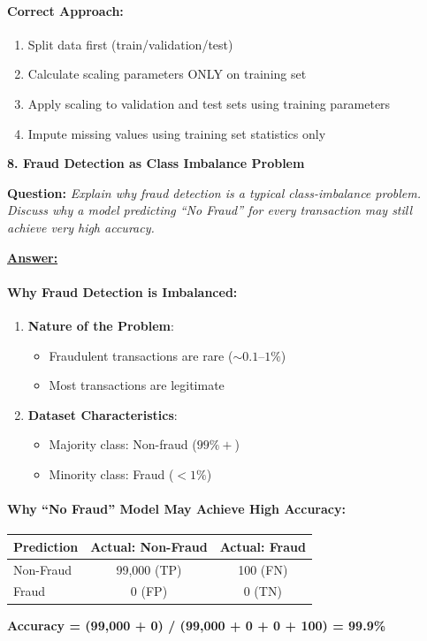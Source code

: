 \documentclass[11pt,a4paper]{article}
\newcommand{\questiontitle}[2]{%
    \vspace{0.4cm}%
    \noindent\textbf{\large\color{headerblue}#1. #2}\par\vspace{0.15cm}%
}
\newcommand{\qprompt}[1]{%
    \noindent\textbf{Question:} \textit{#1}\par\vspace{0.2cm}%
}
\newcommand{\answer}{\noindent\textbf{\underline{Answer:}}\par\vspace{0.15cm}}
\begin{document}
\paragraph{Correct Approach:}
\begin{enumerate}
    \item Split data first (train/validation/test)
    \item Calculate scaling parameters ONLY on training set
    \item Apply scaling to validation and test sets using training parameters
    \item Impute missing values using training set statistics only
\end{enumerate}

\vspace{0.35cm}

\questiontitle{8}{Fraud Detection as Class Imbalance Problem}
\qprompt{Explain why fraud detection is a typical class-imbalance problem. Discuss why a model predicting ``No Fraud'' for every transaction may still achieve very high accuracy.}
\answer
\paragraph{Why Fraud Detection is Imbalanced:}
\begin{enumerate}
    \item \textbf{Nature of the Problem}:
    \begin{itemize}
        \item Fraudulent transactions are rare ($\sim 0.1\text{--}1\%$)
        \item Most transactions are legitimate
    \end{itemize}
    \item \textbf{Dataset Characteristics}:
    \begin{itemize}
        \item Majority class: Non-fraud ($99\%+$)
        \item Minority class: Fraud ($<1\%$)
    \end{itemize}
\end{enumerate}

\paragraph{Why ``No Fraud'' Model May Achieve High Accuracy:}
\begin{center}
\begin{tabular}{lcc}
\toprule
\textbf{Prediction} & \textbf{Actual: Non-Fraud} & \textbf{Actual: Fraud} \\
\midrule
Non-Fraud & 99,000 (TP) & 100 (FN) \\
Fraud & 0 (FP) & 0 (TN) \\
\bottomrule
\end{tabular}
\end{center}
\noindent\textbf{Accuracy = (99,000 + 0) / (99,000 + 0 + 0 + 100) = 99.9\%}
\end{document}
